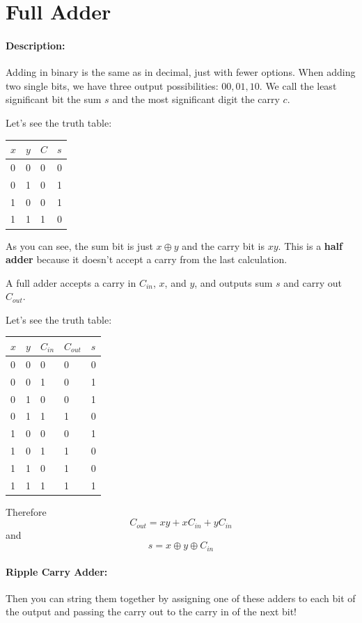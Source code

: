 \documentclass[a4paper,12pt]{report}
\begin{document}
\section{Full Adder}
\paragraph{Description: }
Adding in binary is the same as in decimal, just with fewer options. When adding two single bits,
we have three output possibilities: $00, 01, 10$. We call the least significant bit the sum $s$ and
the most significant digit the carry $c$.

Let's see the truth table:
\begin{tabular}{ll|ll}
$x$ & $y$ & $C$ & $s$ \\
\hline
0 & 0 & 0 & 0 \\
0 & 1 & 0 & 1 \\
1 & 0 & 0 & 1 \\
1 & 1 & 1 & 0 \\
\end{tabular}

As you can see, the sum bit is just $x \oplus y$ and the carry bit is $xy$. 
This is a \textbf{half adder} because it doesn't accept a carry from the last calculation.

A full adder accepts a carry in $C_{in}$, $x$, and $y$, and outputs sum $s$ and carry out $C_{out}$.

Let's see the truth table:
\begin{tabular}{lll|ll}
$x$ & $y$ & $C_{in}$ & $C_{out}$ & $s$ \\
\hline
0 & 0 & 0 & 0 & 0 \\
0 & 0 & 1 & 0 & 1 \\
0 & 1 & 0 & 0 & 1 \\
0 & 1 & 1 & 1 & 0 \\
1 & 0 & 0 & 0 & 1 \\
1 & 0 & 1 & 1 & 0 \\
1 & 1 & 0 & 1 & 0 \\
1 & 1 & 1 & 1 & 1 \\
\end{tabular}

Therefore $$C_{out} = xy + xC_{in} + yC_{in}$$
and $$s = x \oplus y \oplus C_{in}$$

\paragraph{Ripple Carry Adder: } Then you can string them together by assigning one of these 
adders to each bit of the output and passing the carry out to the carry in of the next bit!
\end{document}
